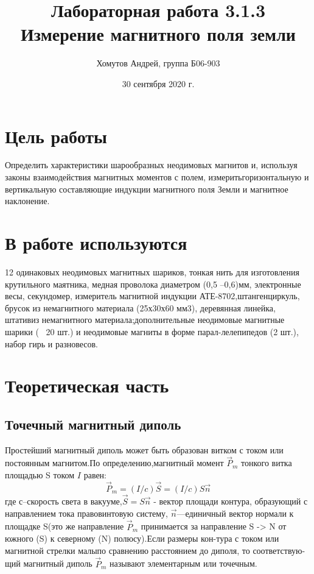\documentclass[a4paper, 12pt]{article}
\author{Хомутов Андрей, группа Б06-903}
\title{Лабораторная работа 3.1.3 \\ Измерение магнитного поля земли
}
\date{30 сентября 2020 г.}
\begin{document}
\maketitle
\thispagestyle{empty}
\newpage

\section*{Цель работы} 
Определить характеристики шарообразных неодимовых магнитов и, используя законы взаимодействия магнитных моментов с полем, измеритьгоризонтальную и вертикальную составляющие индукции магнитного поля Земли и магнитное наклонение.


\section*{В работе используются}
12 одинаковых неодимовых магнитных шариков, тонкая нить для изготовления крутильного маятника, медная проволока диаметром (0,5 –0,6)мм, электронные весы, секундомер, измеритель магнитной индукции АТЕ-8702,штангенциркуль, брусок из немагнитного материала  (25х30х60  мм3), деревянная  линейка, штативиз  немагнитного  материала;дополнительные неодимовые магнитные шарики (~ 20 шт.) и неодимовые магниты в форме парал-лелепипедов (2 шт.), набор гирь и разновесов.
 
\section{Теоретическая часть}
\subsection{Точечный магнитный диполь}
Простейший магнитный диполь может быть образован витком с током или постоянным магнитом.По определению,магнитный момент $\vec{P}_{m}$ тонкого витка площадью S током $I$ равен:
\begin{equation}\vec{P}_{m}=(I / c) \vec{S}=(I / c) S \vec{n}\end{equation}
где с–скорость света в вакууме,$\vec{S}=S \vec{n}$ - вектор площади контура, образующий с направлением тока правовинтовую систему,  $\vec{n}$—единичный вектор нормали к площадке S(это же направление $\vec{P}_{m}$ принимается за направление S -> N от южного (S) к северному (N) полюсу).Если размеры кон-тура с током или магнитной стрелки малыпо сравнению расстоянием до диполя, то соответствую-щий магнитный диполь $\vec{P}_{m}$ называют элементарным или точечным.
\end{document}
